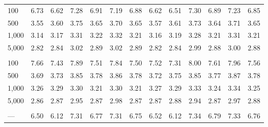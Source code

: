 \documentclass[AMA,STIX1COL,doublespace]{WileyNJD-v2}
\begin{document}
\begin{table}
\begin{tabular}[t]{lcccccccccccc}
\hline
\hspace{1em}100 & 6.73 & 6.62 & 7.28 & 6.91 & 7.19 & 6.88 & 6.62 & 6.51 & 7.30 & 6.89 & 7.23 & 6.85\\
\hspace{1em}500 & 3.55 & 3.60 & 3.75 & 3.65 & 3.70 & 3.65 & 3.57 & 3.61 & 3.73 & 3.64 & 3.71 & 3.65\\
\hspace{1em}1,000 & 3.14 & 3.17 & 3.31 & 3.22 & 3.32 & 3.21 & 3.16 & 3.19 & 3.28 & 3.21 & 3.31 & 3.21\\
\hspace{1em}5,000 & 2.82 & 2.84 & 3.02 & 2.89 & 3.02 & 2.89 & 2.82 & 2.84 & 2.99 & 2.88 & 3.00 & 2.88\\
\addlinespace[0.75em]
\multicolumn{13}{l}{\textbf{10 predictors, 490 junk}}\\
\hline
\hspace{1em}100 & 7.66 & 7.43 & 7.89 & 7.51 & 7.84 & 7.50 & 7.52 & 7.31 & 8.00 & 7.61 & 7.96 & 7.56\\
\hspace{1em}500 & 3.69 & 3.73 & 3.85 & 3.78 & 3.86 & 3.78 & 3.72 & 3.75 & 3.85 & 3.77 & 3.87 & 3.78\\
\hspace{1em}1,000 & 3.26 & 3.29 & 3.30 & 3.21 & 3.30 & 3.21 & 3.27 & 3.29 & 3.33 & 3.24 & 3.34 & 3.25\\
\hspace{1em}5,000 & 2.86 & 2.87 & 2.95 & 2.87 & 2.98 & 2.87 & 2.87 & 2.88 & 2.94 & 2.87 & 2.97 & 2.88\\
\addlinespace[0.75em]
\multicolumn{13}{l}{\textbf{Overall}}\\
\hline
\hspace{1em}--- & 6.50 & 6.12 & 7.31 & 6.77 & 7.31 & 6.75 & 6.52 & 6.12 & 7.34 & 6.79 & 7.33 & 6.76\\
\bottomrule
\end{tabular}
\end{table}
\end{document}
